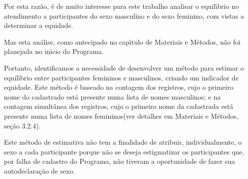 \documentclass[
12pt,		%
openright,	%
twoside,  %
a4paper,			%
chapter=TITLE,		%
english,			%
french,				%
spanish,			%
brazil				%
]{USPSC-classe/USPSC}
\begin{document}
Por esta raz\~ao, \'e de muito interesse para este trabalho analisar o equil\'{\i}brio no atendimento a participantes do sexo masculino e do sexo feminino, com vistas a determinar a equidade.

















Mas esta an\'alise, como antecipado no cap\'{\i}tulo de Materiais e M\'etodos, n\~ao foi planejada no in\'{\i}cio do Programa.

















Portanto, identificamos a necessidade de desenvolver um m\'etodo para estimar o equil\'{\i}brio entre participantes femininos e masculinos, criando um indicador de equidade. Este m\'etodo \'e baseado na contagem dos registros, cujo o primeiro nome do cadastrado est\'a presente numa lista de \textquotedbl nomes masculinos\textquotedbl ; e na contagem simult\^anea dos registros, cujo o primeiro nome da cadastrada est\'a presente numa lista de \textquotedbl  nomes femininos\textquotedbl  (ver detalhes em Materiais e M\'etodos, se\c{c}\~ao 3.2.4).

















Este m\'etodo de \textquotedbl  estimativa \textquotedbl  n\~ao tem a finalidade de atribuir, individualmente, o sexo a cada participante porque n\~ao se deseja estigmatizar os participantes que, por falha de cadastro do Programa, n\~ao tiveram a oportunidade de fazer sua autodeclara\c{c}\~ao de sexo.
\end{document}

